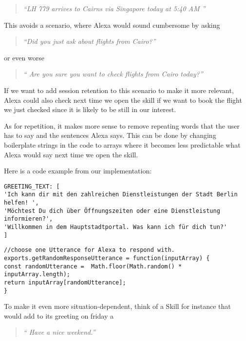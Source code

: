 \begin{enumerate}
 \begin{quotation}
 	\flushright
	\textit{	``LH 779 arrives to Cairns via Singapore today at 5:40 AM ''}
\end{quotation}


This avoids a scenario, where Alexa would sound cumbersome by asking

\begin{quotation}
\flushright
\textit{	``Did you just ask about flights from Cairo?''}
\end{quotation}

or even worse

\begin{quotation}
	\flushright
\textit{	`` Are you sure you want to check flights from Cairo today?''}
\end{quotation}

If we want to add session retention to this scenario to make it more relevant, Alexa could also check next time we open the skill if we want to book the flight we just checked since it is likely to be still in our interest.

As for repetition, it makes more sense to remove repeating words that the user has to say and the sentences Alexa says. This can be done by changing boilerplate strings in the code to arrays where it becomes less predictable what Alexa would say next time we open the skill.

Here is a code example from our implementation:

\begin{verbatim}
GREETING_TEXT: [
'Ich kann dir mit den zahlreichen Dienstleistungen der Stadt Berlin helfen! ',
'Möchtest Du dich über Öffnungszeiten oder eine Dienstleistung informieren?',
'Willkommen in dem Hauptstadtportal. Was kann ich für dich tun?'
]
\end{verbatim}

\begin{verbatim}
//choose one Utterance for Alexa to respond with.
exports.getRandomResponseUtterance = function(inputArray) {
const randomUtterance =  Math.floor(Math.random() * inputArray.length);
return inputArray[randomUtterance];
}
\end{verbatim}

To make it even more situation-dependent, think of a Skill for instance that would add to its greeting on friday a 


\begin{quotation}
	\flushright
	\textit{	`` Have a nice weekend.''}
\end{quotation}


\end{enumerate}

